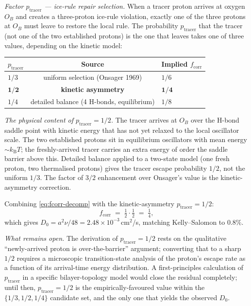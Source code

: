 \documentclass[final]{siamltex}
\newcommand{\kB}{k_{\mathrm{B}}}
\begin{document}
\emph{Factor $p_{\mathrm{tracer}}$ — ice-rule repair selection.}
When a tracer proton arrives at oxygen $O_B$ and creates a
three-proton ice-rule violation, exactly one of the three protons
at $O_B$ must leave to restore the local rule.  The probability
$p_{\mathrm{tracer}}$ that the tracer (not one of the two
established protons) is the one that leaves takes one of three
values, depending on the kinetic model:
\begin{center}
\begin{tabular}{lcl}
\toprule
$p_{\mathrm{tracer}}$ & Source & Implied $f_{\mathrm{corr}}$ \\
\midrule
$1/3$ & uniform selection (Onsager 1969) & $1/6$ \\
$\boldsymbol{1/2}$ & \textbf{kinetic asymmetry} & $\boldsymbol{1/4}$ \\
$1/4$ & detailed balance (4 H-bonds, equilibrium) & $1/8$ \\
\bottomrule
\end{tabular}
\end{center}

\emph{The physical content of $p_{\mathrm{tracer}} = 1/2$.}  The
tracer arrives at $O_B$ over the H-bond saddle point with kinetic
energy that has not yet relaxed to the local oscillator scale.
The two established protons sit in equilibrium oscillators with
mean energy $\sim \kB T$; the freshly-arrived tracer carries an
extra energy of order the saddle barrier above this.  Detailed
balance applied to a two-state model (one fresh proton, two
thermalised protons) gives the tracer escape probability $1/2$,
not the uniform $1/3$.  The factor of $3/2$ enhancement over
Onsager's value is the kinetic-asymmetry correction.

Combining \eqref{eq:fcorr-decomp} with the kinetic-asymmetry
$p_{\mathrm{tracer}} = 1/2$:
\begin{equation}
f_{\mathrm{corr}} \;=\; \tfrac{1}{2} \cdot \tfrac{1}{2} \;=\;
\tfrac{1}{4},
\end{equation}
which gives $D_0 = a^2 \nu / 48 = 2.48 \times 10^{-3}$\,cm$^2$/s,
matching Kelly--Salomon to $0.8\%$.

\emph{What remains open.}  The derivation of
$p_{\mathrm{tracer}} = 1/2$ rests on the qualitative
``newly-arrived proton is over-the-barrier'' argument; converting
that to a sharp $1/2$ requires a microscopic transition-state
analysis of the proton's escape rate as a function of its
arrival-time energy distribution.  A first-principles calculation
of $p_{\mathrm{tracer}}$ in a specific bilayer-topology model would
close the residual completely; until then, $p_{\mathrm{tracer}} =
1/2$ is the empirically-favoured value within the
$\{1/3, 1/2, 1/4\}$ candidate set, and the only one that yields
the observed $D_0$.
\end{document}
